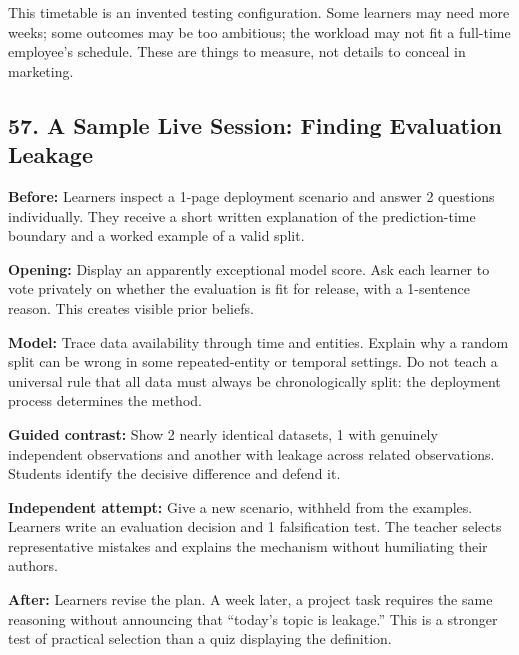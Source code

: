 This timetable is an invented testing configuration. Some learners may need more weeks; some outcomes may be too ambitious; the workload may not fit a full-time employee's schedule. These are things to measure, not details to conceal in marketing.

\subsection*{57. A Sample Live Session: Finding Evaluation Leakage}

\textbf{Before:} Learners inspect a 1-page deployment scenario and answer 2 questions individually. They receive a short written explanation of the prediction-time boundary and a worked example of a valid split.

\textbf{Opening:} Display an apparently exceptional model score. Ask each learner to vote privately on whether the evaluation is fit for release, with a 1-sentence reason. This creates visible prior beliefs.

\textbf{Model:} Trace data availability through time and entities. Explain why a random split can be wrong in some repeated-entity or temporal settings. Do not teach a universal rule that all data must always be chronologically split: the deployment process determines the method.

\textbf{Guided contrast:} Show 2 nearly identical datasets, 1 with genuinely independent observations and another with leakage across related observations. Students identify the decisive difference and defend it.

\textbf{Independent attempt:} Give a new scenario, withheld from the examples. Learners write an evaluation decision and 1 falsification test. The teacher selects representative mistakes and explains the mechanism without humiliating their authors.

\textbf{After:} Learners revise the plan. A week later, a project task requires the same reasoning without announcing that ``today's topic is leakage.'' This is a stronger test of practical selection than a quiz displaying the definition.
